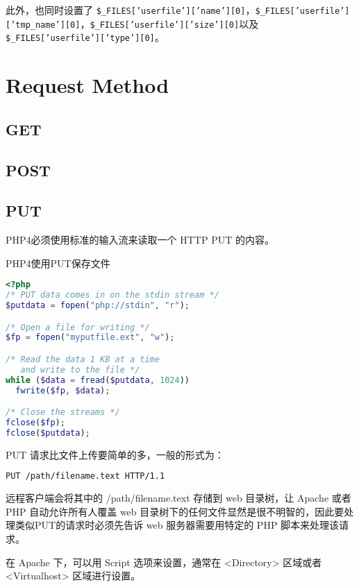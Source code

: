 此外，也同时设置了 \texttt{\$\_FILES['userfile']['name'][0]}，\texttt{\$\_FILES['userfile']['tmp\_name'][0]}，\texttt{\$\_FILES['userfile']['size'][0]}以及 \texttt{\$\_FILES['userfile']['type'][0]}。

\section{Request Method}


\subsection{GET}


\subsection{POST}




\subsection{PUT}

PHP4必须使用标准的输入流来读取一个 HTTP PUT 的内容。

\begin{example}
PHP4使用PUT保存文件
\begin{lstlisting}[language=PHP]
<?php
/* PUT data comes in on the stdin stream */
$putdata = fopen("php://stdin", "r");

/* Open a file for writing */
$fp = fopen("myputfile.ext", "w");

/* Read the data 1 KB at a time
   and write to the file */
while ($data = fread($putdata, 1024))
  fwrite($fp, $data);

/* Close the streams */
fclose($fp);
fclose($putdata);
\end{lstlisting}
\end{example}

PUT 请求比文件上传要简单的多，一般的形式为：

\begin{lstlisting}[language=bash]
PUT /path/filename.text HTTP/1.1
\end{lstlisting}

远程客户端会将其中的 /path/filename.text 存储到 web 目录树，让 Apache 或者 PHP 自动允许所有人覆盖 web 目录树下的任何文件显然是很不明智的，因此要处理类似PUT的请求时必须先告诉 web 服务器需要用特定的 PHP 脚本来处理该请求。

在 Apache 下，可以用 Script 选项来设置，通常在 <Directory> 区域或者 <Virtualhost> 区域进行设置。

